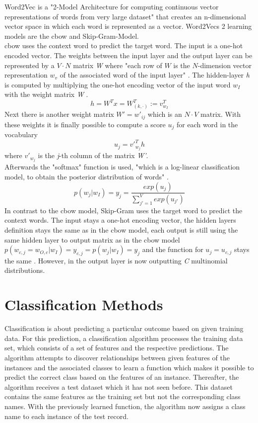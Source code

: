 \documentclass[a4paper, 11pt,titlepage,oneside,openany]{book}
\begin{document}
Word2Vec is a "2-Model Architecture for computing continuous vector representations of words from very large dataset"\cite{effiecientestimation} that creates an n-dimensional vector space in which each word is represented as a vector. Word2Vecs 2 learning models are the \gls{cbow} and Skip-Gram-Model.\\
\noindent \gls{cbow} uses the context word to predict the target word. The input is a one-hot encoded vector. The weights between the input layer and the output layer can be represented by a $V \cdot N$ matrix \textit{W} where "each row of $W$ is the $N$-dimension vector representation $w_v$ of the associated word of the input layer" \cite{word2vecparam}. The hidden-layer \textit{h} is computed by multiplying the one-hot encoding vector of the input word $w_I$ with the weight matrix \textit{W} \cite{word2vecparam}.
\[
h=W^Tx=W_{(k, \cdot)}^{T}:=v_{w_I}^{T}
\] 
Next there is another weight matrix $W'={w'_{ij}}$ which is an $N \cdot V$ matrix. With these weights it is finally possible to compute a score $u_j$ for each word in the vocabulary \cite{word2vecparam}
\[
u_{j}={v'}_{w_j}^{T}h
\] where ${v'}_{w_j}$ is the \textit{j}-th column of the matrix \textit{W'}. \\
\newpage
\noindent Afterwards the "softmax" function is used, "which is a log-linear classification model, to obtain the posterior distribution of words" \cite{word2vecparam}.
\[
p(w_j|w_I)=y_j=\frac{exp(u_j)}{\sum_{j'=1}^V exp(u_{j'})}
\] 
\indent In contrast to the \gls{cbow} model,  Skip-Gram uses the target word to predict the context words. The input stays a one-hot encoding vector, the hidden layers definition stays the same as in the \gls{cbow} model, each output is still using the same hidden layer to output matrix as in the \gls{cbow} model $p(w_{c,j}=w_{O,c}|w_I)=y_{c,j} = p(w_j|w_I)=y_j$ and the function for $u_j=u_{c,j}$ stays the same \cite{word2vecparam}. However, in the output layer is now outputting \textit{C} multinomial distributions.  

\section{Classification Methods}
Classification is about predicting a particular outcome based on given training data. For this prediction, a classification algorithm processes the training data set, which consists of a set of features and the respective predictions. The algorithm attempts to discover relationships between given features  of the instances and the associated classes to learn a function which makes it possible to predict the correct class based on the features of an instance. Thereafter, the algorithm receives a test dataset which it has not seen before. This dataset contains the same features as the training set but not the corresponding class names. With the previously learned function, the algorithm now assigns a class name to each instance  of the test record. \\
\end{document}
